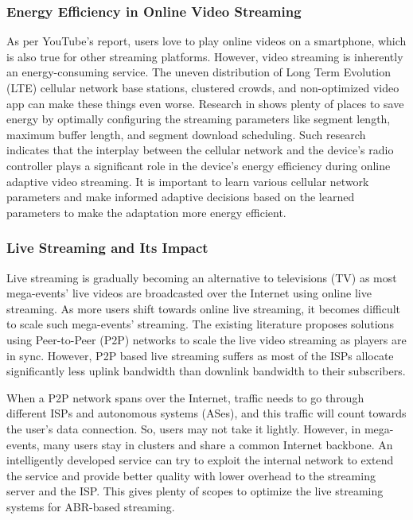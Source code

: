 \subsubsection{Energy Efficiency in Online Video Streaming}
As per YouTube's report, users love to play online videos on a smartphone, which is also true for other streaming platforms. However, video streaming is inherently an energy-consuming service. The uneven distribution of Long Term Evolution (LTE) cellular network base stations, clustered crowds, and non-optimized video app can make these things even worse. Research in \cite{10.1145/2910018.2910656} shows plenty of places to save energy by optimally configuring the streaming parameters like segment length, maximum buffer length, and segment download scheduling. Such research indicates that the interplay between the cellular network and the device's radio controller plays a significant role in the device's energy efficiency during online adaptive video streaming. It is important to learn various cellular network parameters and make informed adaptive decisions based on the learned parameters to make the adaptation more energy efficient.

\subsubsection{Live Streaming and Its Impact}
Live streaming is gradually becoming an alternative to televisions (TV) as most mega-events' live videos are broadcasted over the Internet using online live streaming. As more users shift towards online live streaming, it becomes difficult to scale such mega-events' streaming. The existing literature proposes solutions using Peer-to-Peer (P2P) networks to scale the live video streaming as players are in sync. However, P2P based live streaming suffers as most of the ISPs allocate significantly less uplink bandwidth than downlink bandwidth to their subscribers. 

When a P2P network spans over the Internet, traffic needs to go through different ISPs and autonomous systems (ASes), and this traffic will count towards the user's data connection. So, users may not take it lightly. However, in mega-events, many users stay in clusters and share a common Internet backbone. An intelligently developed service can try to exploit the internal network to extend the service and provide better quality with lower overhead to the streaming server and the ISP. This gives plenty of scopes to optimize the live streaming systems for ABR-based streaming.


